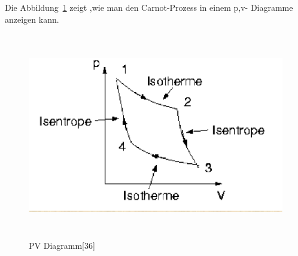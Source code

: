  Die Abbildung~\ref{fig:pv} zeigt ,wie man den Carnot-Prozess in einem p,v- Diagramme anzeigen kann.
 \begin{figure}[!htb]
\begin{center}
\includegraphics[height=9cm]{bilder/pv.eps}
\end{center}
\caption{PV Diagramm[36]}\label{fig:pv}
\end{figure}





%



 







